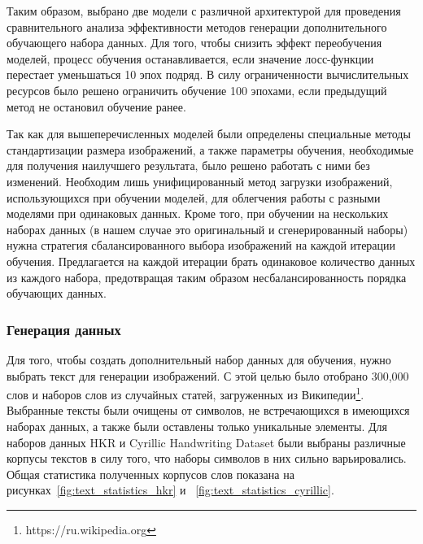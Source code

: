 Таким образом, выбрано две модели с различной архитектурой для проведения сравнительного анализа эффективности методов генерации дополнительного обучающего набора данных.
Для того, чтобы снизить эффект переобучения моделей, процесс обучения останавливается, если значение лосс-функции перестает уменьшаться 10 эпох подряд.
В силу ограниченности вычислительных ресурсов было решено ограничить обучение 100 эпохами, если предыдущий метод не остановил обучение ранее.

Так как для вышеперечисленных моделей были определены специальные методы стандартизации размера изображений, а также параметры обучения,
необходимые для получения наилучшего результата, было решено работать с ними без изменений.
Необходим лишь унифицированный метод загрузки изображений, использующихся при обучении моделей, для облегчения работы с разными моделями при одинаковых данных.
Кроме того, при обучении на нескольких наборах данных (в нашем случае это оригинальный и сгенерированный наборы) нужна
стратегия сбалансированного выбора изображений на каждой итерации обучения.
Предлагается на каждой итерации брать одинаковое количество данных из каждого набора,
предотвращая таким образом несбалансированность порядка обучающих данных.

\subsubsection{Генерация данных}

Для того, чтобы создать дополнительный набор данных для обучения, нужно выбрать текст для генерации изображений.
С этой целью было отобрано 300,000 слов и наборов слов из случайных статей, загруженных из Википедии\footnote{https://ru.wikipedia.org}.
Выбранные тексты были очищены от символов, не встречающихся в имеющихся наборах данных, а также были оставлены только уникальные элементы.
Для наборов данных HKR и Cyrillic Handwriting Dataset были выбраны различные корпусы текстов в силу того, что наборы символов в них сильно варьировались.
Общая статистика полученных корпусов слов показана на рисунках~\ref{fig:text_statistics_hkr} и ~\ref{fig:text_statistics_cyrillic}.

